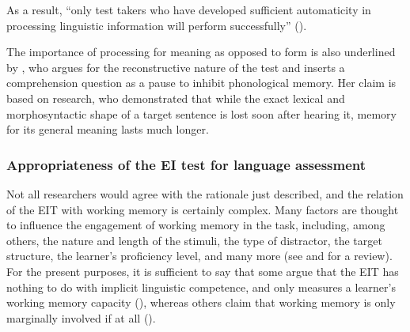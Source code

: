 As a result, “only test takers who have developed sufficient automaticity in processing linguistic information will perform successfully” (\citealt[332]{Van-Moere2012}). 

The importance of processing for meaning as opposed to form is also underlined by \citet{Erlam2006}, who argues for the reconstructive nature of the test and inserts a comprehension question as a pause to inhibit phonological memory. Her claim is based on  research, who demonstrated that while the exact lexical and morphosyntactic shape of a target sentence is lost soon after hearing it, memory for its general meaning lasts much longer.

\subsubsection{Appropriateness of the EI test for language assessment}

Not all researchers would agree with the rationale just described, and the relation of the EIT with working memory is certainly complex. Many factors are thought to influence the engagement of working memory in the task, including, among others, the nature and length of the stimuli, the type of distractor, the target structure, the learner's proficiency level, and many more (see \citealt{Vinther2002} and \citealt{Erlam2006} for a review). For the present purposes, it is sufficient to say that some argue that the EIT has nothing to do with implicit linguistic competence, and only measures a learner's working memory capacity (\citealt{JessopEtAl2007}), whereas others claim that working memory is only marginally involved if at all (\citealt{OkuraLonsdale2012}).

